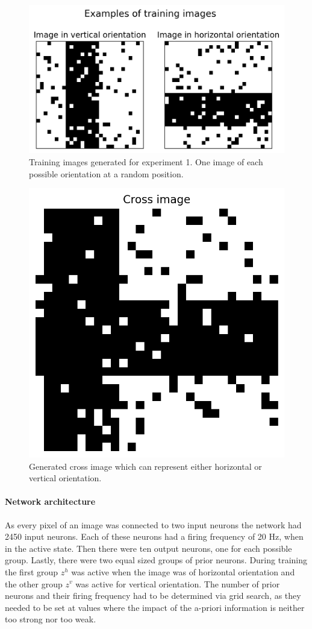 \begin{figure}
  \includegraphics[width=\linewidth]{figures/horvert/horvertTrainingImages.png}
  \caption{Training images generated for experiment 1. One image of each possible orientation at a random position.}
  \label{fig:horvertImages}
\end{figure}

\begin{figure}
\centering
  \includegraphics[width=0.6\linewidth]{figures/horvert/horvertTrainingCrossImage.png}
  \caption{Generated cross image which can represent either horizontal or vertical orientation.}
  \label{fig:horvertTrainingCrossImage}
\end{figure}

\paragraph{Network architecture}

As every pixel of an image was connected to two input neurons the network had 2450 input neurons. Each of these neurons had a firing frequency of 20 Hz, when in the active state. Then there were ten output neurons, one for each possible group. Lastly, there were two equal sized groups of prior neurons. During training the first group $z^h$ was active when the image was of horizontal orientation and the other group $z^v$ was active for vertical orientation. The number of prior neurons and their firing frequency had to be determined via grid search, as they needed to be set at values where the impact of the a-priori information is neither too strong nor too weak.

